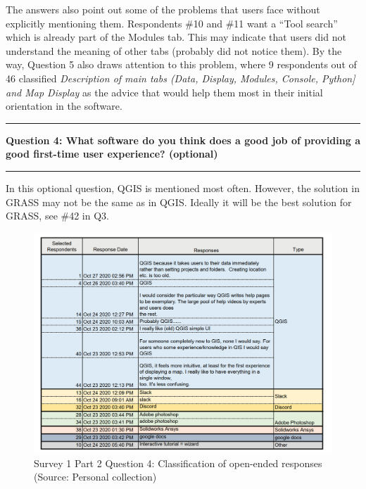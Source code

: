 \documentclass[a4paper,10pt,twoside]{article}
\begin{document}
The answers also point out some of the problems that users face
without explicitly mentioning them. Respondents \#10 and \#11 want a
``Tool search'' which is already part of the Modules tab. This may
indicate that users did not understand the meaning of other tabs
(probably did not notice them). By the way, Question 5 also draws
attention to this problem, where 9 respondents out of 46 classified
\textit{Description of main tabs (Data, Display, Modules, Console,
  Python] and Map Display} as the advice that would help them most in
their initial orientation in the software.

\par\noindent\rule{\textwidth}{0.4pt}
\noindent \textbf{Question 4: What software do you think does a good job of providing a good first-time user experience? (optional)}
\par\noindent\rule{\textwidth}{0.4pt}
\noindent In this optional question, QGIS is mentioned most
often. However, the solution in GRASS may not be the same as in
QGIS. Ideally it will be the best solution for GRASS, see \#42 in Q3.

\vspace{0.3cm}
\begin{figure}[hbt!] 
\begin{center}
\includegraphics[width=17cm]{../surveys/analyzed_data/survey1_part2_question4_open_ended_1.png} 
\caption[Survey 1 Part 2 Question 4: Classification of open-ended responses]{Survey 1 Part 2 Question 4: Classification of open-ended responses (Source: Personal collection)}
\label{fig:survey1_part2_question4_open_ended_1}
\end{center}
\end{figure}
\end{document}
